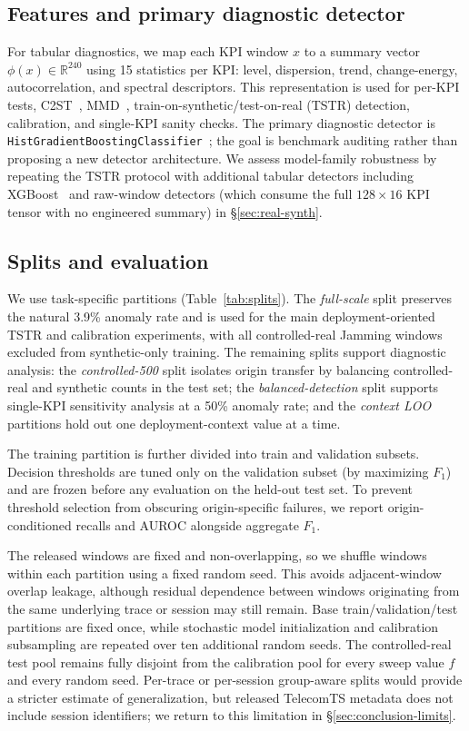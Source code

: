 \documentclass[sigconf,review]{acmart}
\begin{document}
\subsection{Features and primary diagnostic detector}
For tabular diagnostics, we map each KPI window $x$ to a summary vector $\phi(x)\in\mathbb{R}^{240}$ using 15 statistics per KPI: level, dispersion, trend, change-energy, autocorrelation, and spectral descriptors. This representation is used for per-KPI tests, C2ST~\citep{lopezpaz2017c2st}, MMD~\citep{gretton2012mmd}, train-on-synthetic/test-on-real (TSTR) detection, calibration, and single-KPI sanity checks. The primary diagnostic detector is \texttt{HistGradientBoostingClassifier}~\citep{pedregosa2011sklearn}; the goal is benchmark auditing rather than proposing a new detector architecture. We assess model-family robustness by repeating the TSTR protocol with additional tabular detectors including XGBoost~\citep{chen2016xgboost} and raw-window detectors (which consume the full $128\times16$ KPI tensor with no engineered summary) in \S\ref{sec:real-synth}.

\subsection{Splits and evaluation}
We use task-specific partitions (Table~\ref{tab:splits}). The \emph{full-scale} split preserves the natural 3.9\% anomaly rate and is used for the main deployment-oriented TSTR and calibration experiments, with all controlled-real Jamming windows excluded from synthetic-only training. The remaining splits support diagnostic analysis: the \emph{controlled-500} split isolates origin transfer by balancing controlled-real and synthetic counts in the test set; the \emph{balanced-detection} split supports single-KPI sensitivity analysis at a 50\% anomaly rate; and the \emph{context LOO} partitions hold out one deployment-context value at a time.

The training partition is further divided into train and validation
subsets. Decision thresholds are tuned only on the validation subset
(by maximizing $F_1$) and are frozen before any evaluation on the
held-out test set. To prevent threshold selection from obscuring
origin-specific failures, we report origin-conditioned recalls and
AUROC alongside aggregate $F_1$.

The released windows are fixed and non-overlapping, so we shuffle
windows within each partition using a fixed random seed. This avoids
adjacent-window overlap leakage, although residual dependence
between windows originating from the same underlying trace or
session may still remain. Base train/validation/test partitions are
fixed once, while stochastic model initialization and calibration
subsampling are repeated over ten additional random seeds. The controlled-real test pool remains fully disjoint from
the calibration pool for every sweep value $f$ and every random
seed. Per-trace or per-session group-aware splits would provide a
stricter estimate of generalization, but released TelecomTS metadata
does not include session identifiers; we return to this limitation in
\S\ref{sec:conclusion-limits}.
\end{document}

